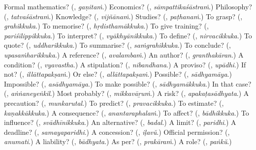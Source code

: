 \begin{tcolorbox}[breakable,colback=teal!4,colframe=teal!35!black,title={Before you move on}]
Formal mathematics? (\textbf{}, \emph{gaṇitaṁ}.) Economics? (\textbf{}, \emph{sāmpattikaśāstraṁ}.) Philosophy? (\textbf{}, \emph{tatvaśāstraṁ}.) Knowledge? (\textbf{}, \emph{vijñānaṁ}.) Studies? (\textbf{}, \emph{paṭhanaṁ}.) To grasp? (\textbf{}, \emph{grahikkuka}.) To memorise? (\textbf{}, \emph{hṛdisthamākkuka}.) To give training? (\textbf{}, \emph{pariśīlippikkuka}.) To interpret? (\textbf{}, \emph{vyākhyānikkuka}.) To define? (\textbf{}, \emph{nirvacikkuka}.) To quote? (\textbf{}, \emph{uddharikkuka}.) To summarise? (\textbf{}, \emph{saṁgrahikkuka}.) To conclude? (\textbf{}, \emph{upasaṁharikkuka}.) A reference? (\textbf{}, \emph{avalambaṁ}.) An author? (\textbf{}, \emph{granthakāran}.) A condition? (\textbf{}, \emph{vyavastha}.) A stipulation? (\textbf{}, \emph{nibandhana}.) A proviso? (\textbf{}, \emph{upādhi}.) If not? (\textbf{}, \emph{illāttapakṣaṁ}.) Or else? (\textbf{}, \emph{allāttapakṣaṁ}.) Possible? (\textbf{}, \emph{sādhyamāya}.) Impossible? (\textbf{}, \emph{asādhyamāya}.) To make possible? (\textbf{}, \emph{sādhyamākkuka}.) In that case? (\textbf{}, \emph{aṅṅaneyeṅkil}.) Most probably? (\textbf{}, \emph{mikkavāṟuṁ}.) A risk? (\textbf{}, \emph{apakaṭasādhyata}.) A precaution? (\textbf{}, \emph{munkarutal}.) To predict? (\textbf{}, \emph{pravacikkuka}.) To estimate? (\textbf{}, \emph{kaṇakkākkuka}.) A consequence? (\textbf{}, \emph{anantaraphalaṁ}.) To affect? (\textbf{}, \emph{bādhikkuka}.) To influence? (\textbf{}, \emph{svādhīnikkuka}.) An alternative? (\textbf{}, \emph{badal}.) A limit? (\textbf{}, \emph{paridhi}.) A deadline? (\textbf{}, \emph{samayaparidhi}.) A concession? (\textbf{}, \emph{iḷavŭ}.) Official permission? (\textbf{}, \emph{anumati}.) A liability? (\textbf{}, \emph{bādhyata}.) As per? (\textbf{}, \emph{prakāraṁ}.) A role? (\textbf{}, \emph{paṅkŭ}.)
\end{tcolorbox}
